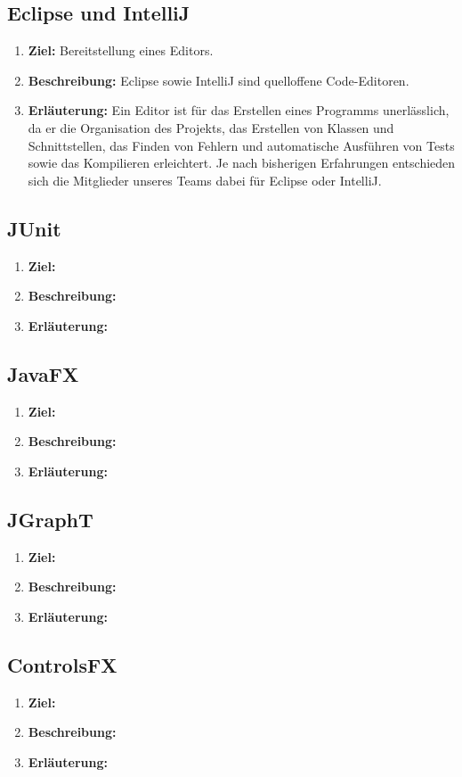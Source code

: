 \documentclass[parskip=full,11pt]{scrartcl}
\begin{document}
\subsection{Eclipse und IntelliJ}
\begin{enumerate}
\item[] \textbf{Ziel:} Bereitstellung eines Editors.
\item[] \textbf{Beschreibung:} Eclipse sowie IntelliJ sind quelloffene Code-Editoren.
\item[] \textbf{Erläuterung:} Ein Editor ist für das Erstellen eines Programms unerlässlich, da er die Organisation des Projekts, das Erstellen von Klassen und Schnittstellen, das Finden von Fehlern und automatische Ausführen von Tests sowie das Kompilieren erleichtert. Je nach bisherigen Erfahrungen entschieden sich die Mitglieder unseres Teams dabei für Eclipse oder IntelliJ.
\end{enumerate}
\subsection{JUnit}
\begin{enumerate}
\item[] \textbf{Ziel:}
\item[] \textbf{Beschreibung:}
\item[] \textbf{Erläuterung:}
\end{enumerate}
\subsection{JavaFX}
\begin{enumerate}
\item[] \textbf{Ziel:}
\item[] \textbf{Beschreibung:}
\item[] \textbf{Erläuterung:}
\end{enumerate}
\subsection{JGraphT}
\begin{enumerate}
\item[] \textbf{Ziel:}
\item[] \textbf{Beschreibung:}
\item[] \textbf{Erläuterung:}
\end{enumerate}
\subsection{ControlsFX}
\begin{enumerate}
\item[] \textbf{Ziel:}
\item[] \textbf{Beschreibung:}
\item[] \textbf{Erläuterung:}
\end{enumerate}
\end{document}
